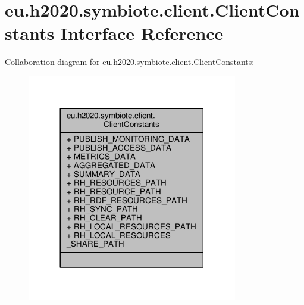 \hypertarget{interfaceeu_1_1h2020_1_1symbiote_1_1client_1_1ClientConstants}{}\section{eu.\+h2020.\+symbiote.\+client.\+Client\+Constants Interface Reference}
\label{interfaceeu_1_1h2020_1_1symbiote_1_1client_1_1ClientConstants}


Collaboration diagram for eu.\+h2020.\+symbiote.\+client.\+Client\+Constants\+:
\nopagebreak
\begin{figure}[H]
\begin{center}
\leavevmode
\includegraphics[width=260pt]{interfaceeu_1_1h2020_1_1symbiote_1_1client_1_1ClientConstants__coll__graph}
\end{center}
\end{figure}
